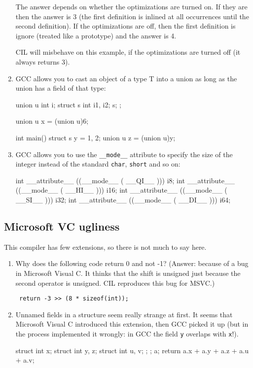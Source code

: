 \documentclass{article}
\def\t#1{{\tt #1}}
\begin{document}
\begin{enumerate}
 The answer depends on whether the optimizations are turned on. If they are
then the answer is 3 (the first definition is inlined at all occurrences until
the second definition). If the optimizations are off, then the first
definition is ignore (treated like a prototype) and the answer is 4. 

 CIL will misbehave on this example, if the optimizations are turned off (it
 always returns 3).

\item GCC allows you to cast an object of a type T into a union as long as the
union has a field of that type:
\begin{cilcode}[global]
union u { 
   int i; 
   struct s { 
      int i1, i2;
   } s;
};

union u x = (union u)6;

int main() {
  struct s y = {1, 2};
  union u  z = (union u)y;
}
\end{cilcode}

\item GCC allows you to use the \t{\_\_mode\_\_} attribute to specify the size
of the integer instead of the standard \t{char}, \t{short} and so on:
\begin{cilcode}[global]
int __attribute__ ((__mode__ (  __QI__ ))) i8;
int __attribute__ ((__mode__ (  __HI__ ))) i16;
int __attribute__ ((__mode__ (  __SI__ ))) i32;
int __attribute__ ((__mode__ (  __DI__ ))) i64;
\end{cilcode}

\end{enumerate}

 \subsection{Microsoft VC ugliness}

 This compiler has few extensions, so there is not much to say here.

\begin{enumerate}
\item Why does the following code return 0 and not -1? (Answer: because of a
bug in Microsoft Visual C. It thinks that the shift is unsigned just because
the second operator is unsigned. CIL reproduces this bug for MSVC.)

\begin{verbatim}
 return -3 >> (8 * sizeof(int));
\end{verbatim}

\item Unnamed fields in a structure seem really strange at first. It seems
that Microsoft Visual C introduced this extension, then GCC picked it up (but
in the process implemented it wrongly: in GCC the field \t{y} overlaps with
\t{x}!).

\begin{cilcode}[local]
struct {
  int x;
  struct {
     int y, z;
     struct {
       int u, v;
     };
 };
} a;
return a.x + a.y + a.z + a.u + a.v;
\end{cilcode}


\end{enumerate}
\end{document}
